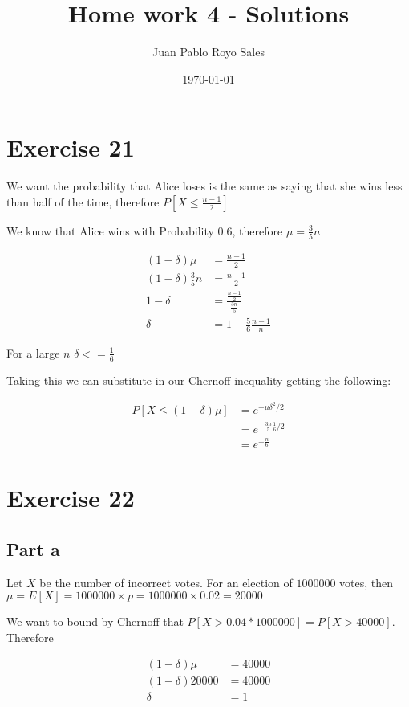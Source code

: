 \documentclass[12pt, a4paper]{article}
\title{Home work 4 - Solutions}
\author{Juan Pablo Royo Sales}
\date\today
\begin{document}
\maketitle

\section{Exercise 21}
We want the probability that Alice loses is the same as saying that she wins
less than half of the time, therefore $P[X \leq \frac{n - 1}{2}]$

We know that Alice wins with Probability $0.6$, therefore $\mu = \frac{3}{5}n$

\begin{align*}
    (1 - \delta)\mu  &= \frac{n - 1}{2}\\
    (1 - \delta)\frac{3}{5}n &= \frac{n - 1}{2}\\
    1 - \delta &= \frac{\frac{n-1}{2}}{\frac{3n}{5}}\\
    \delta &= 1 - \frac{5}{6}\frac{n-1}{n}
\end{align*}

For a large $n$ $\delta <= \frac{1}{6}$

Taking this we can substitute in our Chernoff inequality getting the following:

\begin{align*}
    P\left[X \leq (1 - \delta)\mu\right] &= e^{-\mu \delta^2/2}\\
                                         &= e^{-\frac{3n}{5}\frac{1}{6}/2}\\
                                         &= e^{-\frac{n}{6}}
\end{align*}

\section{Exercise 22}
\subsection{Part a}\label{part:a}

Let $X$ be the number of incorrect votes. For an election of $1000000$ votes, then
$\mu = E[X]=1000000 \times p = 1000000 \times 0.02 = 20000$

We want to bound by Chernoff that $P[X> 0.04 * 1000000] = P[X>40000]$. Therefore

\begin{align*}
	(1 - \delta)\mu &= 40000 \\
  (1 - \delta)20000 &= 40000\\
	\delta &= 1
\end{align*}
\end{document}
